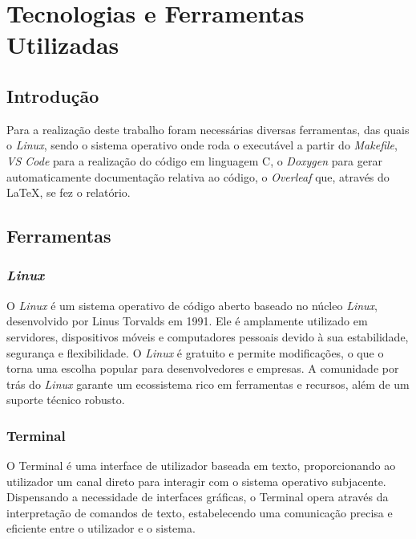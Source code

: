 \chapter{Tecnologias e Ferramentas Utilizadas}
\label{chap:tecno-ferra}

\section{Introdução}
\label{chap3:sec:intro}
Para a realização deste trabalho foram necessárias diversas ferramentas,
das quais o \textit{Linux}, sendo o sistema operativo onde roda o executável a partir do \textit{Makefile}, \textit{\ac{VS Code}} para a realização do código em linguagem C\cite{devdocsDevDocsx2014C}, o \textit{Doxygen} para gerar automaticamente documentação relativa ao código, o \textit{Overleaf} que, através do \LaTeX, se fez o relatório.

\section{Ferramentas}
\label{chap3:sec:ferramentas}

\subsection{\textit{Linux}}
\label{chap3:subsec:Linux}
O \textit{Linux} é um sistema operativo de código aberto baseado no núcleo \textit{Linux}, desenvolvido por Linus Torvalds em 1991. Ele é amplamente utilizado em servidores, dispositivos móveis e computadores pessoais devido à sua estabilidade, segurança e flexibilidade. O \textit{Linux} é gratuito e permite modificações, o que o torna uma escolha popular para desenvolvedores e empresas. A comunidade por trás do \textit{Linux} garante um ecossistema rico em ferramentas e recursos, além de um suporte técnico robusto.

\newpage

\subsection{Terminal}
\label{chap3:subsec:terminal}
O Terminal é uma interface de utilizador baseada em texto, proporcionando ao utilizador um canal direto para interagir com o sistema operativo subjacente. Dispensando a necessidade de interfaces gráficas, o Terminal opera através da interpretação de comandos de texto, estabelecendo uma comunicação precisa e eficiente entre o utilizador e o sistema.

